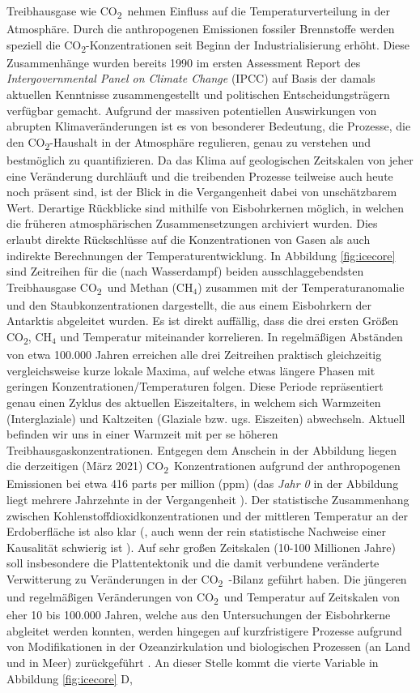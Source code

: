 \documentclass[12pt,a4paper,onecolumn,headheight=30pt]{scrartcl}
\newcommand{\cotwo}{CO\textsubscript{2}}
\begin{document}
\sloppy %
Treibhausgase wie \cotwo \ nehmen Einfluss auf die Temperaturverteilung in der Atmosphäre. Durch die anthropogenen Emissionen fossiler Brennstoffe werden speziell die \cotwo -Konzentrationen seit Beginn der Industrialisierung erhöht. Diese Zusammenhänge wurden bereits 1990 im ersten Assessment Report des \textit{Intergovernmental Panel on Climate Change} (IPCC) auf Basis der damals aktuellen Kenntnisse zusammengestellt und politischen Entscheidungsträgern verfügbar gemacht. Aufgrund der massiven potentiellen Auswirkungen von abrupten Klimaveränderungen \citep{IPCCpol.2018} ist es von besonderer Bedeutung, die Prozesse, die den \cotwo -Haushalt in der Atmosphäre regulieren, genau zu verstehen und bestmöglich zu quantifizieren. Da das Klima auf geologischen Zeitskalen von jeher eine Veränderung durchläuft und die treibenden Prozesse teilweise auch heute noch präsent sind, ist der Blick in die Vergangenheit dabei von unschätzbarem Wert. Derartige Rückblicke sind mithilfe von Eisbohrkernen möglich, in welchen die früheren atmosphärischen Zusammensetzungen archiviert wurden. Dies erlaubt direkte Rückschlüsse auf die Konzentrationen von Gasen als auch indirekte Berechnungen der Temperaturentwicklung. In Abbildung \ref{fig:icecore} sind  Zeitreihen für die (nach Wasserdampf) beiden ausschlaggebendsten Treibhausgase \cotwo \ und Methan (CH$_4$) zusammen mit der Temperaturanomalie und den Staubkonzentrationen dargestellt, die aus einem Eisbohrkern der Antarktis abgeleitet wurden. Es ist direkt auffällig, dass die drei ersten Größen \cotwo , CH$_4$ und Temperatur miteinander korrelieren. In regelmäßigen Abständen von etwa 100.000 Jahren erreichen alle drei Zeitreihen praktisch gleichzeitig vergleichsweise kurze lokale Maxima, auf welche etwas längere Phasen mit geringen Konzentrationen/Temperaturen folgen. Diese Periode repräsentiert genau einen Zyklus des aktuellen Eiszeitalters, in welchem sich Warmzeiten (Interglaziale) und Kaltzeiten (Glaziale bzw. ugs. Eiszeiten) abwechseln. Aktuell befinden wir uns in einer Warmzeit mit per se höheren Treibhausgaskonzentrationen. Entgegen dem Anschein in der Abbildung liegen die derzeitigen (März 2021) \cotwo \ Konzentrationen aufgrund der anthropogenen Emissionen bei etwa 416 parts per million (ppm) \citep{NASA.06.05.2021} (das \textit{Jahr 0} in der Abbildung liegt mehrere Jahrzehnte in der Vergangenheit \citep{Luthi.2008}). Der statistische Zusammenhang zwischen Kohlenstoffdioxidkonzentrationen und der mittleren Temperatur an der Erdoberfläche ist also klar (, auch wenn der rein statistische Nachweise einer Kausalität schwierig ist \citep{Stips.2016}). Auf sehr großen Zeitskalen (10-100 Millionen Jahre) soll insbesondere die Plattentektonik und die damit verbundene veränderte Verwitterung zu Veränderungen in der \cotwo \ -Bilanz geführt haben. Die jüngeren und regelmäßigen Veränderungen von \cotwo \ und Temperatur auf Zeitskalen von eher 10 bis 100.000 Jahren, welche aus den Untersuchungen der Eisbohrkerne abgleitet werden konnten, werden hingegen auf kurzfristigere Prozesse aufgrund von Modifikationen in der Ozeanzirkulation und biologischen Prozessen (an Land und in Meer) zurückgeführt \citep{Emerson.2009}. An dieser Stelle kommt die vierte Variable in Abbildung \ref{fig:icecore} D, 
\end{document}
